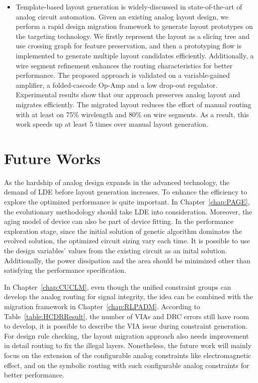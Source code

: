 \begin{itemize}
      \item Template-based layout generation is widely-discussed in state-of-the-art of analog circuit automation. Given an existing analog layout design, we perform a rapid design migration framework to generate layout prototypes on the targeting technology. We firstly represent the layout as a slicing tree and use crossing graph for feature preservation, and then a prototyping flow is implemented to generate multiple layout candidates efficiently. Additionally, a wire segment refinement enhances the routing characteristics for better performance. The proposed approach is validated on a variable-gained amplifier, a folded-cascode Op-Amp and a low drop-out regulator. Experimental results show that our approach preserves analog layout and migrates efficiently. The migrated layout reduces the effort of manual routing with at least on 75\% wirelength and 80\% on wire segments. As a result, this work speeds up at least 5 times over manual layout generation. 
    \end{itemize}

  \section{Future Works}\label{sec:FW}


    As the hardship of analog design expands in the advanced technology, the demand of LDE before layout generation increases. To enhance the efficiency to explore the optimized performance is quite important. In Chapter~\ref{chap:PAGE}, the evolutionary methodology should take LDE into consideration. Moreover, the aging model of device can also be part of device fitting. In the performance exploration stage, since the initial solution of genetic algorithm dominates the evolved solution, the optimized circuit sizing vary each time. It is possible to use the design variables' values from the existing circuit as an inital solution. Additionally, the power dissipation and the area should be minimized other than satisfying the performance specification. 

    In Chapter~\ref{chap:CUCLM}, even though the unified constraint groups can develop the analog routing for signal integrity, the idea can be combined with the migration framework in Chapter~\ref{chap:RLPADM}. According to Table~\ref{table:HCDRResult}, the number of VIAs and DRC errors still have room to develop, it is possible to describe the VIA issue during constraint generation. For design rule checking, the layout migration approach also needs improvement in detail routing to fix the illegal layers. Nonetheless, the future work will mainly focus on the extension of the configurable analog constraints like electromagnetic effect, and on the symbolic routing with such configurable analog constraints for better performance.

